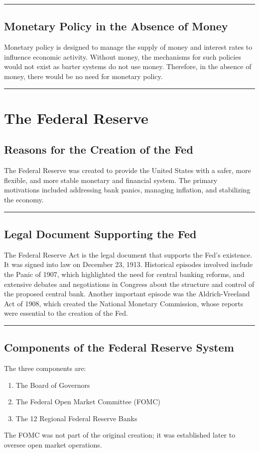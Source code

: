 \documentclass{article}
\begin{document}
\noindent\rule{\linewidth}{0.5pt}

\subsection{Monetary Policy in the Absence of Money}
Monetary policy is designed to manage the supply of money and interest rates to influence economic activity. Without money, the mechanisms for such policies would not exist as barter systems do not use money. Therefore, in the absence of money, there would be no need for monetary policy.

\noindent\rule{\linewidth}{1pt}

\section{The Federal Reserve}

\subsection{Reasons for the Creation of the Fed}
The Federal Reserve was created to provide the United States with a safer, more flexible, and more stable monetary and financial system. The primary motivations included addressing bank panics, managing inflation, and stabilizing the economy.

\noindent\rule{\linewidth}{0.5pt}

\subsection{Legal Document Supporting the Fed}
The Federal Reserve Act is the legal document that supports the Fed's existence. It was signed into law on December 23, 1913. Historical episodes involved include the Panic of 1907, which highlighted the need for central banking reforms, and extensive debates and negotiations in Congress about the structure and control of the proposed central bank. Another important episode was the Aldrich-Vreeland Act of 1908, which created the National Monetary Commission, whose reports were essential to the creation of the Fed.

\noindent\rule{\linewidth}{0.5pt}

\subsection{Components of the Federal Reserve System}
The three components are:
\begin{enumerate}
    \item The Board of Governors
    \item The Federal Open Market Committee (FOMC)
    \item The 12 Regional Federal Reserve Banks
\end{enumerate}
The FOMC was not part of the original creation; it was established later to oversee open market operations.
\end{document}
